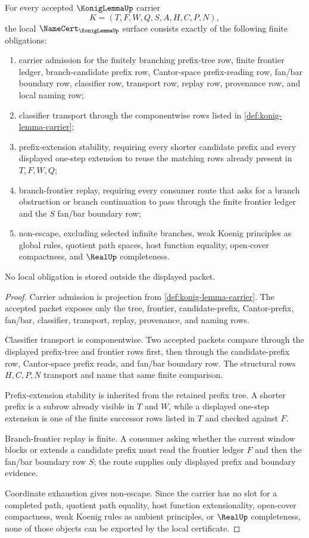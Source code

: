 \begin{theorem}
\label{thm:konig-lemma-namecert-obligations}
For every accepted $\KonigLemmaUp$ carrier
$$
K=(T,F,W,Q,S,A,H,C,P,N),
$$
the local $\NameCert_{\KonigLemmaUp}$ surface consists exactly of the following finite obligations:
\begin{enumerate}
\item carrier admission for the finitely branching prefix-tree row, finite frontier ledger, branch-candidate prefix row, Cantor-space prefix-reading row, fan/bar boundary row, classifier row, transport row, replay row, provenance row, and local naming row;
\item classifier transport through the componentwise rows listed in \autoref{def:konig-lemma-carrier};
\item prefix-extension stability, requiring every shorter candidate prefix and every displayed one-step extension to reuse the matching rows already present in $T,F,W,Q$;
\item branch-frontier replay, requiring every consumer route that asks for a branch obstruction or branch continuation to pass through the finite frontier ledger and the $S$ fan/bar boundary row;
\item non-escape, excluding selected infinite branches, weak Koenig principles as global rules, quotient path spaces, host function equality, open-cover compactness, and $\RealUp$ completeness.
\end{enumerate}
No local obligation is stored outside the displayed packet.
\end{theorem}
\begin{proof}
Carrier admission is projection from \autoref{def:konig-lemma-carrier}. The accepted packet exposes only the tree, frontier, candidate-prefix, Cantor-prefix, fan/bar, classifier, transport, replay, provenance, and naming rows.

Classifier transport is componentwise. Two accepted packets compare through the displayed prefix-tree and frontier rows first, then through the candidate-prefix row, Cantor-space prefix reads, and fan/bar boundary row. The structural rows $H,C,P,N$ transport and name that same finite comparison.

Prefix-extension stability is inherited from the retained prefix tree. A shorter prefix is a subrow already visible in $T$ and $W$, while a displayed one-step extension is one of the finite successor rows listed in $T$ and checked against $F$.

Branch-frontier replay is finite. A consumer asking whether the current window blocks or extends a candidate prefix must read the frontier ledger $F$ and then the fan/bar boundary row $S$; the route supplies only displayed prefix and boundary evidence.

Coordinate exhaustion gives non-escape. Since the carrier has no slot for a completed path, quotient path equality, host function extensionality, open-cover compactness, weak Koenig rules as ambient principles, or $\RealUp$ completeness, none of those objects can be exported by the local certificate.
\end{proof}

